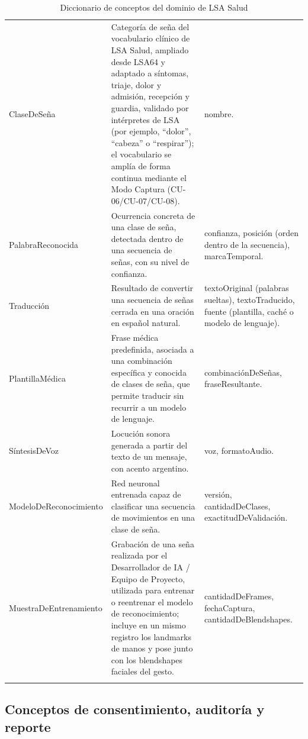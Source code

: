 \begin{longtable}{p{3.6cm} p{5.4cm} p{5.4cm}}
    Clase\-De\-Seña &
    Categoría de seña del vocabulario clínico de LSA Salud, ampliado desde
    LSA64 y adaptado a síntomas, triaje, dolor y admisión, recepción y
    guardia, validado por intérpretes de LSA (por ejemplo,
    ``dolor'', ``cabeza'' o ``respirar''); el vocabulario se amplía de forma
    continua mediante el Modo Captura (CU-06/CU-07/CU-08). &
    nombre. \\

    Palabra\-Reconocida &
    Ocurrencia concreta de una clase de seña, detectada dentro de una
    secuencia de señas, con su nivel de confianza. &
    confianza, posición (orden dentro de la secuencia), marcaTemporal. \\

    Traducción &
    Resultado de convertir una secuencia de señas cerrada en una oración
    en español natural. &
    textoOriginal (palabras sueltas), textoTraducido, fuente (plantilla,
    caché o modelo de lenguaje). \\

    Plantilla\-Médica &
    Frase médica predefinida, asociada a una combinación específica y
    conocida de clases de seña, que permite traducir sin recurrir a un
    modelo de lenguaje. &
    combinaciónDeSeñas, fraseResultante. \\

    Síntesis\-De\-Voz &
    Locución sonora generada a partir del texto de un mensaje, con acento
    argentino. &
    voz, formatoAudio. \\

    Modelo\-De\-Reconocimiento &
    Red neuronal entrenada capaz de clasificar una secuencia de
    movimientos en una clase de seña. &
    versión, cantidadDeClases, exactitudDeValidación. \\

    Muestra\-De\-Entrenamiento &
    Grabación de una seña realizada por el Desarrollador de IA / Equipo de
    Proyecto, utilizada para entrenar o reentrenar el modelo de
    reconocimiento; incluye en un mismo registro los landmarks de manos y
    pose junto con los blendshapes faciales del gesto. &
    cantidadDeFrames, fechaCaptura, cantidadDeBlendshapes. \\
    \bottomrule
    \caption{Diccionario de conceptos del dominio de LSA Salud}
    \label{tab:diccionario-conceptos}
\end{longtable}

\subsection{Conceptos de consentimiento, auditoría y reporte}
\label{sec:dom-pendientes}

